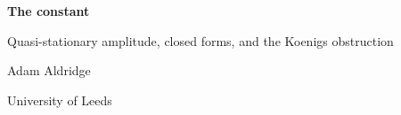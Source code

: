 \documentclass[11pt]{report}
\begin{document}
\begin{titlepage}
\centering
\vspace*{4cm}
{\LARGE\bfseries The constant \unboldmath\par}
\vspace{6pt}
{\large Quasi-stationary amplitude, closed forms, and the Koenigs obstruction\par}
\vspace{2.5cm}
{\large Adam Aldridge\par}
\vspace{4pt}
{University of Leeds\par}
\end{titlepage}

\tableofcontents
\clearpage

\setcounter{chapter}{2}



\FloatBarrier
\begingroup
\footnotesize


\endgroup
\end{document}
